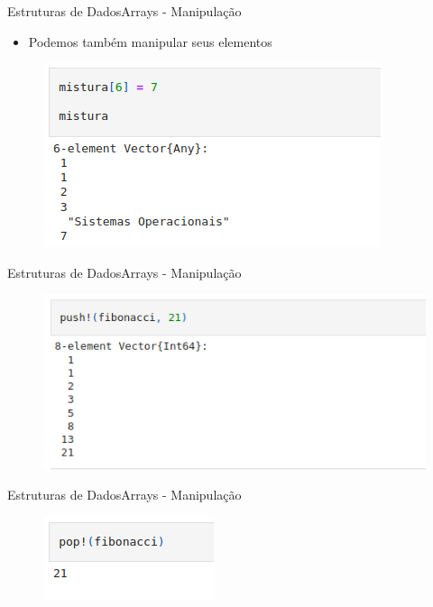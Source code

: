 \documentclass{beamer}
\begin{document}
\begin{frame}{Estruturas de Dados}{Arrays - Manipulação}
    \begin{itemize}
        \item Podemos também manipular seus elementos
    \end{itemize}
    \begin{figure}
        \centering
        \includegraphics[scale=0.5]{imagens/array05.png}
        \label{fig:my_label}
    \end{figure}
\end{frame}

\begin{frame}{Estruturas de Dados}{Arrays - Manipulação}
    \begin{figure}
        \centering
        \includegraphics[scale=0.5]{imagens/array07.png}
        \label{fig:my_label}
    \end{figure}
\end{frame}

\begin{frame}{Estruturas de Dados}{Arrays - Manipulação}
    \begin{figure}
        \centering
        \includegraphics[scale=0.5]{imagens/array08.png}
        \label{fig:my_label}
    \end{figure}
\end{frame}
\end{document}
